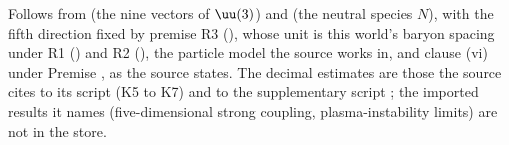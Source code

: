 Follows from  (the nine vectors of $\uu(3)$) and  (the neutral species $N$), with the fifth direction fixed by premise R3 (), whose unit is this world's baryon spacing under R1 () and R2 (), the particle model the source works in, and clause (vi) under Premise , as the source states. The decimal estimates are those the source cites to its script (K5 to K7) and to the supplementary script ; the imported results it names (five-dimensional strong coupling, plasma-instability limits) are not in the store.
